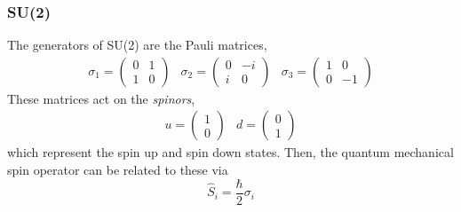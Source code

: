 \documentclass[]{dwnotes}
\begin{document}
\subsubsection{SU(2)}
The generators of SU(2) are the Pauli matrices,
\begin{equation*}
  \begin{matrix}
    \sigma_1 = \begin{pmatrix} 0 & 1 \\ 1 & 0 \end{pmatrix} &
    \sigma_2 = \begin{pmatrix}  0 & -i \\ i & 0 \end{pmatrix} &
    \sigma_3 = \begin{pmatrix}  1 & 0 \\ 0 & -1 \end{pmatrix}
  \end{matrix}
\end{equation*}
These matrices act on the \emph{spinors}, 
\begin{equation*}
  \begin{matrix}
    u = \begin{pmatrix} 1 \\ 0 \end{pmatrix} &
    d = \begin{pmatrix} 0 \\ 1 \end{pmatrix}
  \end{matrix}
\end{equation*}
which represent the spin up and spin down states. Then, the quantum
mechanical spin operator can be related to these via 
\begin{equation}
  \label{eq:spinoperator}
  \hat{S}_i = \frac{\hbar}{2} \sigma_i
\end{equation}
\end{document}
